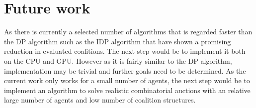 \documentclass[a4paper, 12pt]{report}
\begin{document}
\section{Future work}
As there is currently a selected number of algorithms that is regarded faster than the DP algorithm such as the IDP algorithm \citep{rahwan2008improved} that have shown a promising reduction in evaluated coalitions. The next step would be to implement it both on the CPU and GPU. However as it is fairly similar to the DP algorithm, implementation may be trivial and further goals need to be determined. As the current work only works for a small number of agents, the next step would be to implement an algorithm to solve realistic combinatorial auctions with an relative large number of agents and low number of coalition structures. 



\end{document}
